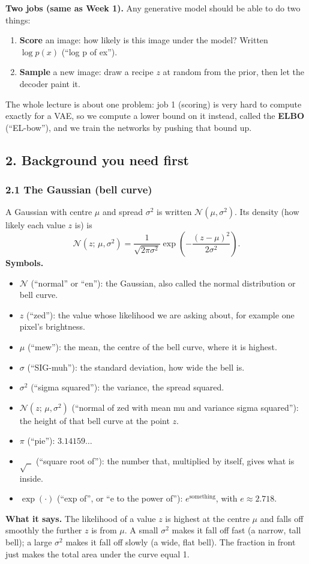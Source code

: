 \textbf{Two jobs (same as Week 1).} Any generative model should be able to do two things:
\begin{enumerate}[leftmargin=1.5em]
\item \textbf{Score} an image: how likely is this image under the model? Written $\log p(x)$ (``log p of ex'').
\item \textbf{Sample} a new image: draw a recipe $z$ at random from the prior, then let the decoder paint it.
\end{enumerate}

The whole lecture is about one problem: job 1 (scoring) is very hard to compute exactly for a VAE, so we compute a lower bound on it instead, called the \textbf{ELBO} (``EL-bow''), and we train the networks by pushing that bound up.

\subsection*{2. Background you need first}

\subsubsection*{2.1 The Gaussian (bell curve)}

A Gaussian with centre $\mu$ and spread $\sigma^2$ is written $\mathcal{N}(\mu, \sigma^2)$. Its density (how likely each value $z$ is) is
\[
\mathcal{N}(z;\, \mu, \sigma^2) = \frac{1}{\sqrt{2\pi\sigma^2}} \exp\!\left( -\frac{(z-\mu)^2}{2\sigma^2} \right).
\]
\textbf{Symbols.}
\begin{itemize}[leftmargin=1.5em, itemsep=0pt]
\item $\mathcal{N}$ (``normal'' or ``en''): the Gaussian, also called the normal distribution or bell curve.
\item $z$ (``zed''): the value whose likelihood we are asking about, for example one pixel's brightness.
\item $\mu$ (``mew''): the mean, the centre of the bell curve, where it is highest.
\item $\sigma$ (``SIG-muh''): the standard deviation, how wide the bell is.
\item $\sigma^2$ (``sigma squared''): the variance, the spread squared.
\item $\mathcal{N}(z;\,\mu,\sigma^2)$ (``normal of zed with mean mu and variance sigma squared''): the height of that bell curve at the point $z$.
\item $\pi$ (``pie''): $3.14159\ldots$
\item $\sqrt{\;\;}$ (``square root of''): the number that, multiplied by itself, gives what is inside.
\item $\exp(\cdot)$ (``exp of'', or ``e to the power of''): $e^{\text{something}}$, with $e \approx 2.718$.
\end{itemize}
\textbf{What it says.} The likelihood of a value $z$ is highest at the centre $\mu$ and falls off smoothly the further $z$ is from $\mu$. A small $\sigma^2$ makes it fall off fast (a narrow, tall bell); a large $\sigma^2$ makes it fall off slowly (a wide, flat bell). The fraction in front just makes the total area under the curve equal 1.

